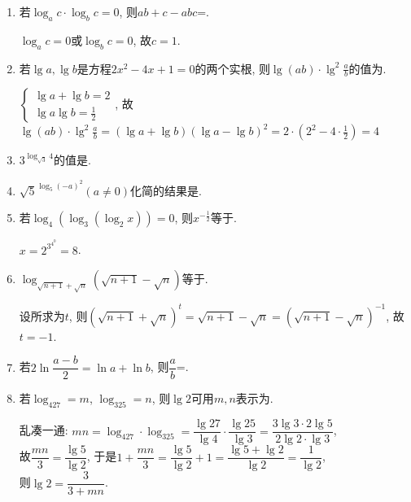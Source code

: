 \begin{enumerate}
\item 若$\log_ac\cdot\log_bc=0$, 则$ab+c-abc$=. 
\begin{jieda}
$\log_ac=0$或$\log_bc=0$, 故$c=1$. 
\end{jieda}


\item 若$\lg{a},\lg{b}$是方程$2x^2-4x+1=0$的两个实根, 则$\lg(ab)\cdot\lg^2\frac{a}{b}$的值为. 
\begin{jieda}
$\begin{cases}
\lg{a}+\lg{b}=2\\
\lg{a}\lg{b}=\frac{1}{2}
\end{cases}$, 
故$\lg(ab)\cdot\lg^2\frac{a}{b}=(\lg{a}+\lg{b})(\lg{a}-\lg{b})^2=2\cdot(2^2-4\cdot\frac{1}{2})=4$
\end{jieda}

\item $3^{\log_{\sqrt{3}}4}$的值是.

\item $\sqrt{5}^{\log_5(-a)^2}(a\neq 0)$化简的结果是.


\item 若$\log_4(\log_3(\log_2x))=0$, 则$x^{-\frac{1}{2}}$等于.
\begin{jieda}
$x=2^{3^{4^0}}=8$. 
\end{jieda}

\item $\log_{\sqrt{n+1}+\sqrt{n}}\left(\sqrt{n+1}-\sqrt{n}\right)$等于.
\begin{jieda}
设所求为$t$, 则$(\sqrt{n+1}+\sqrt{n})^t=\sqrt{n+1}-\sqrt{n}=(\sqrt{n+1}-\sqrt{n})^{-1}$, 故$t=-1$. 
\end{jieda}

\item 若$2\ln\dfrac{a-b}{2}=\ln{a}+\ln{b}$, 则$\dfrac{a}{b}$=. 


\item 若$\log_427=m$, $\log_325=n$, 则$\lg2$可用$m,n$表示为. 
\begin{jieda}
乱凑一通: $mn=\log_427\cdot\log_325=\dfrac{\lg27}{\lg4}\cdot\dfrac{\lg25}{\lg3}=\dfrac{3\lg3\cdot2\lg5}{2\lg2\cdot\lg3}$, \\
故$\dfrac{mn}{3}=\dfrac{\lg5}{\lg2}$, 于是$1+\dfrac{mn}{3}=\dfrac{\lg5}{\lg2}+1=\dfrac{\lg5+\lg2}{\lg2}=\dfrac{1}{\lg2}$, \\
则$\lg2=\dfrac{3}{3+mn}$. 
\end{jieda}



\end{enumerate}
